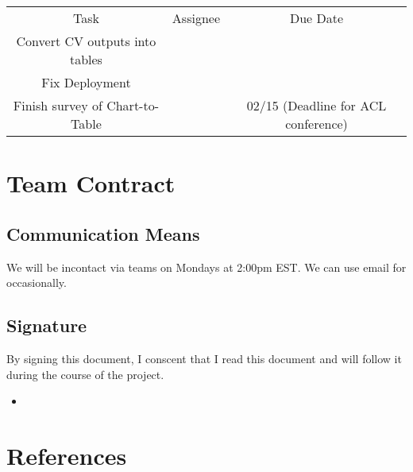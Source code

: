 \documentclass[
	letterpaper, %
]{jdf}
\begin{document}
            \begin{table}
                 \begin{tabular}{|c|c|c|}
                     Task & Assignee & Due Date \\
                     Convert CV outputs into tables & & \\
                     Fix Deployment & & \\
                     Finish survey of Chart-to-Table & & 02/15 (Deadline for ACL conference) \\
                 \end{tabular}
                 \caption{}
                 \label{}
                  \end{table}

\section{Team Contract}\label{sect:team-contract}
\subsection{Communication Means}
We will be incontact via teams on Mondays at 2:00pm EST.
We can use email for occasionally.
\subsection{Signature}
By signing this document, I conscent that I read this document and will follow it
during the course of the project.
\begin{itemize}
         \item 
              \end{itemize}

\section{References}
\printbibliography[heading=none]
\end{document}
